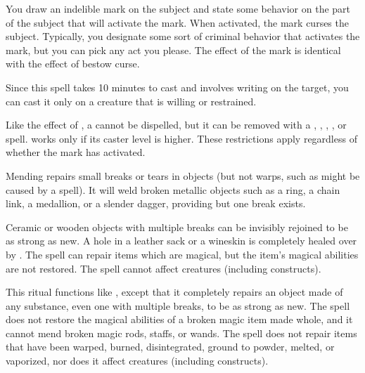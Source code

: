 \spelleffect You draw an indelible mark on the subject and state some behavior on the part of the subject that will activate the mark. When activated, the mark curses the subject. Typically, you designate some sort of criminal behavior that activates the mark, but you can pick any act you please. The effect of the mark is identical with the effect of bestow curse.
\par Since this spell takes 10 minutes to cast and involves writing on the target, you can cast it only on a creature that is willing or restrained.
\par Like the effect of , a  cannot be dispelled, but it can be removed with a , , , , or  spell.  works only if its caster level is higher. These restrictions apply regardless of whether the mark has activated.

\spelleffect Mending repairs small breaks or tears in objects (but not warps, such as might be caused by a  spell). It will weld broken metallic objects such as a ring, a chain link, a medallion, or a slender dagger, providing but one break exists.
\par Ceramic or wooden objects with multiple breaks can be invisibly rejoined to be as strong as new. A hole in a leather sack or a wineskin is completely healed over by . The spell can repair items which are magical, but the item's magical abilities are not restored. 
\spellnotes The spell cannot affect creatures (including constructs).

\spelleffect This ritual functions like , except that it completely repairs an object made of any substance, even one with multiple breaks, to be as strong as new. The spell does not restore the magical abilities of a broken magic item made whole, and it cannot mend broken magic rods, staffs, or wands. The spell does not repair items that have been warped, burned, disintegrated, ground to powder, melted, or vaporized, nor does it affect creatures (including constructs).

